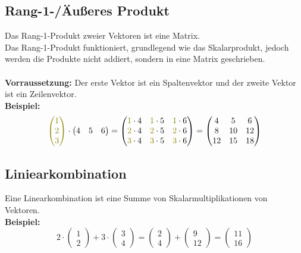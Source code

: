 \documentclass[12pt,a4paper]{article}
\begin{document}
\subsection{Rang-1-/Äußeres Produkt}
Das Rang-1-Produkt zweier Vektoren ist eine Matrix. \\
Das Rang-1-Produkt funktioniert, grundlegend wie das Skalarprodukt, jedoch werden die Produkte nicht addiert, sondern in eine Matrix geschrieben. \\ \\
\textbf{Vorraussetzung:} Der erste Vektor ist ein Spaltenvektor und der zweite Vektor ist ein Zeilenvektor. \\
\textbf{Beispiel:}
\[
    \textcolor{olive}{
    \begin{pmatrix}
        1 \\
        2 \\
        3
    \end{pmatrix}
    }
    \cdot
    \begin{pmatrix}
        4 & 5 & 6
    \end{pmatrix}
    =
    \begin{pmatrix}
        \textcolor{olive}{1} \cdot 4 & \textcolor{olive}{1} \cdot 5 & \textcolor{olive}{1} \cdot 6 \\
        \textcolor{olive}{2} \cdot 4 & \textcolor{olive}{2} \cdot 5 & \textcolor{olive}{2} \cdot 6 \\
        \textcolor{olive}{3} \cdot 4 & \textcolor{olive}{3} \cdot 5 & \textcolor{olive}{3} \cdot 6
    \end{pmatrix}
    =
    \begin{pmatrix}
        4 & 5 & 6 \\
        8 & 10 & 12 \\
        12 & 15 & 18
    \end{pmatrix}
\]

\subsection{Liniearkombination}
Eine Linearkombination ist eine Summe von Skalarmultiplikationen von Vektoren. \\
\textbf{Beispiel:}
\[
2 \cdot
\begin{pmatrix}
1 \\
2
\end{pmatrix}
+
3 \cdot
\begin{pmatrix}
3 \\
4
\end{pmatrix}
=
\begin{pmatrix}
2 \\
4
\end{pmatrix}
+
\begin{pmatrix}
9 \\
12
\end{pmatrix}
=
\begin{pmatrix}
11 \\
16
\end{pmatrix}
\]
\newpage
\end{document}
